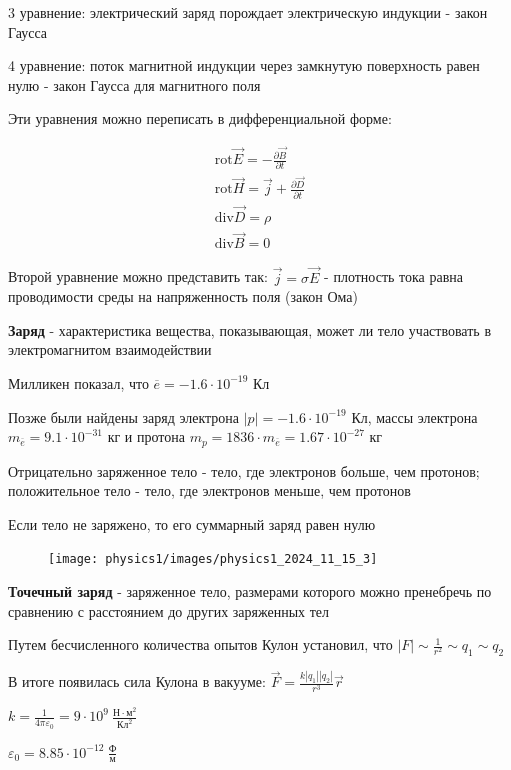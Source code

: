 \documentclass[12pt]{article}
\begin{document}
    3 уравнение: электрический заряд порождает электрическую индукции - закон Гаусса

    4 уравнение: поток магнитной индукции через замкнутую поверхность равен нулю - закон Гаусса для магнитного поля

    Эти уравнения можно переписать в дифференциальной форме:

    \begin{tcolorbox}[colframe=green!25, colback=green!10]
        \begin{gather*}
            \mathrm{rot} \vec{E} = -\frac{\partial \vec{B}}{\partial t}\\
            \mathrm{rot} \vec{H} = \vec{j} + \frac{\partial \vec{D}}{\partial t}\\
            \mathrm{div} \vec{D} = \rho\\
            \mathrm{div} \vec{B} = 0
        \end{gather*}
    \end{tcolorbox}

    Второй уравнение можно представить так: $\vec{j} = \sigma \vec{E}$ - 
    плотность тока равна проводимости среды на напряженность поля (закон Ома)

    \textbf{Заряд} - характеристика вещества, показывающая, может ли тело участвовать в электромагнитом взаимодействии

    Милликен показал, что $\overline{e} = -1.6 \cdot 10^{-19}$ Кл 

    Позже были найдены заряд электрона $|p| = -1.6 \cdot 10^{-19}$ Кл, массы электрона $m_{\overline{e}} = 9.1 \cdot 10^{-31}$ кг и протона $m_p = 1836 \cdot m_{\overline{e}} = 1.67 \cdot 10^{-27}$ кг

    Отрицательно заряженное тело - тело, где электронов больше, чем протонов; положительное тело - тело, где электронов меньше, чем протонов

    Если тело не заряжено, то его суммарный заряд равен нулю

    \smallvspace

    \begin{minipage}{\textwidth}
        \begin{figure}
            \texttt{[image: physics1/images/physics1\_2024\_11\_15\_3]}
        \end{figure}

        \textbf{Точечный заряд} - заряженное тело, размерами которого можно пренебречь по сравнению с расстоянием до других заряженных тел

        Путем бесчисленного количества опытов Кулон установил, что $|F| \sim \frac{1}{r^2} \sim q_1 \sim q_2$

        В итоге появилась сила Кулона в вакууме: 
        $\vec{F} = \frac{k|q_1| |q_2|}{r^3} \vec{r}$

        $k = \frac{1}{4\pi \varepsilon_0} = 9 \cdot 10^9 \ \frac{\text{Н} \cdot \text{м}^2}{\text{Кл}^2}$

        $\varepsilon_0 = 8.85 \cdot 10^{-12} \ \frac{\text{Ф}}{\text{м}}$
    \end{minipage}
    
\end{document}
